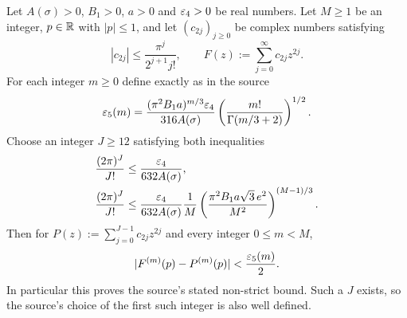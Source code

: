 \begin{agammaproposition}\label{agamma:prop:taylor}
Let $A(\sigma)>0$, $B_1>0$, $a>0$ and $\varepsilon_4>0$ be real numbers.
Let $M\ge1$ be an integer, $p\in\mathbb R$ with $|p|\le1$, and let
$(c_{2j})_{j\ge0}$ be complex numbers satisfying
\begin{equation}\label{agamma:eq:coefficient-bound}
|c_{2j}|\le\frac{\pi^j}{2^{j+1}j!},\qquad
F(z):=\sum_{j=0}^\infty c_{2j}z^{2j}.
\end{equation}
For each integer $m\ge0$ define exactly as in the source
\begin{equation}\label{agamma:eq:epsilon5}
\varepsilon_5(m)=\frac{(\pi^2B_1a)^{m/3}\varepsilon_4}{316 A(\sigma)}
\left(\frac{m!}{\Gamma(m/3+2)}\right)^{1/2}.
\end{equation}
Choose an integer $J\ge12$ satisfying both inequalities
\begin{align}
\frac{(2\pi)^J}{J!}&\le\frac{\varepsilon_4}{632 A(\sigma)},\label{agamma:eq:Jfirst}\\
\frac{(2\pi)^J}{J!}&\le\frac{\varepsilon_4}{632 A(\sigma)}\frac1M
\left(\frac{\pi^2 B_1a\sqrt3\,e^2}{M^2}\right)^{(M-1)/3}.
\label{agamma:eq:Jsecond}
\end{align}
Then for $P(z):=\sum_{j=0}^{J-1}c_{2j}z^{2j}$ and every integer
$0\le m<M$,
\begin{equation}\label{agamma:eq:taylor-conclusion}
|F^{(m)}(p)-P^{(m)}(p)|<\frac{\varepsilon_5(m)}2.
\end{equation}
In particular this proves the source's stated non-strict bound.
Such a $J$ exists, so the source's choice of the first such integer
is also well defined.
\end{agammaproposition}
